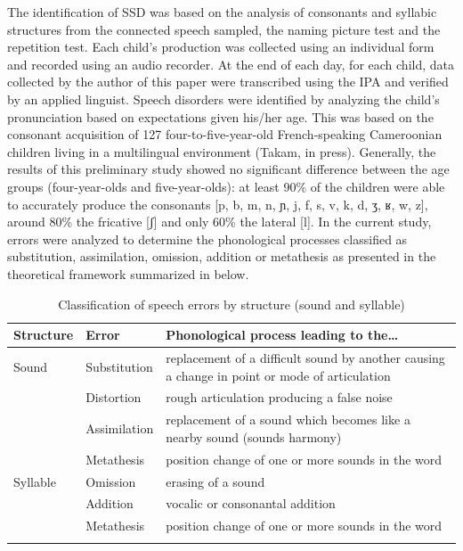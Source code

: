 \documentclass[output=paper,newtxmath,modfonts,nonflat,draftmode]{langsci/langscibook}
\begin{document}
The identification of SSD was based on the analysis of consonants and syllabic structures from the connected speech sampled, the naming picture test and the repetition test. Each child’s production was collected using an individual form and recorded using an audio recorder. At the end of each day, for each child, data collected by the author of this paper were transcribed using the IPA and verified by an applied linguist. Speech disorders were identified by analyzing the child’s pronunciation based on expectations given his/her age. This was based on the consonant acquisition of 127 four-to-five-year-old French-speaking Cameroonian children living in a multilingual environment (Takam, in press). Generally, the results of this preliminary study showed no significant difference between the age groups (four-year-olds and five-year-olds): at least 90\% of the children were able to accurately produce the consonants [p, b, m, n, ɲ, j, f, s, v, k, d, ʒ, ʁ, w, z], around 80\% the fricative [ʃ] and only 60\% the lateral [l]. In the current study, errors were analyzed to determine the phonological processes classified as substitution, assimilation, omission, addition or metathesis as presented in the theoretical framework summarized in  below. 

\begin{table}
\caption{Classification of speech errors by structure (sound and syllable)}
\begin{tabularx}{\textwidth}{llQ}
\lsptoprule
{Structure}  & {Error}  & {Phonological} {process} {leading} {to} {the…}\\
\midrule
Sound & Substitution & replacement of a difficult sound by another causing a change in point or mode of articulation\\
\tablevspace
& Distortion & rough articulation producing a false noise\\
\tablevspace
& Assimilation & replacement of a sound which becomes like a nearby sound (sounds harmony)\\
\tablevspace
& Metathesis & position change of one or more sounds in the word\\
\tablevspace
Syllable & Omission & erasing of a sound\\
\tablevspace
& Addition & vocalic or consonantal addition\\
\tablevspace
& Metathesis & position change of one or more sounds in the word\\
\lspbottomrule
\end{tabularx}
\label{tab:takam:2}
\end{table}
\end{document}
